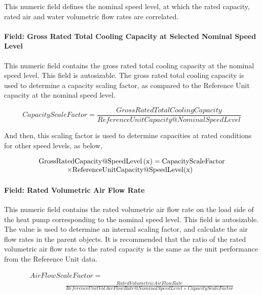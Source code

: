 This numeric field defines the nominal speed level, at which the rated capacity, rated air and water volumetric flow rates are correlated.

\paragraph{Field: Gross Rated Total Cooling Capacity at Selected Nominal Speed Level}\label{field-gross-rated-total-cooling-capacity-at-selected-nominal-speed-level-1}

This numeric field contains the gross rated total cooling capacity at the nominal speed level. This field is autosizable. The gross rated total cooling capacity is used to determine a capacity scaling factor, as compared to the Reference Unit capacity at the nominal speed level.

\begin{equation}
CapacityScaleFactor = \frac{{GrossRatedTotalCoolingCapacity}}{{ReferenceUnitCapacity@NominalSpeedLevel}}
\end{equation}

And then, this scaling factor is used to determine capacities at rated conditions for other speed levels, as below,

\begin{equation}
  \begin{array}{l}
    \rm{GrossRatedCapacity} @ \rm{SpeedLevel} \left( x \right) = \rm{CapacityScaleFactor} \\
    \quad \quad \quad \quad \times \rm{ReferenceUnitCapacity} @ \rm{SpeedLevel}( x )
  \end{array}
\end{equation}

\paragraph{Field: Rated Volumetric Air Flow Rate}\label{field-rated-volumetric-air-flow-rate-1}

This numeric field contains the rated volumetric air flow rate on the load side of the heat pump corresponding to the nominal speed level. This field is autosizable. The value is used to determine an internal scaling factor, and calculate the air flow rates in the parent objects. It is recommended that the ratio of the rated volumetric air flow rate to the rated capacity is the same as the unit performance from the Reference Unit data.

\begin{equation}
  \begin{array}{l}
    AirFlowScaleFactor = \\\quad \quad \quad \quad \quad \frac{{RatedVolumetricAirFlowRate}}{{ReferenceUnitVolAirFlowRate@NominalSpeedLevel \times CapacityScaleFactor}}
  \end{array}
\end{equation}

